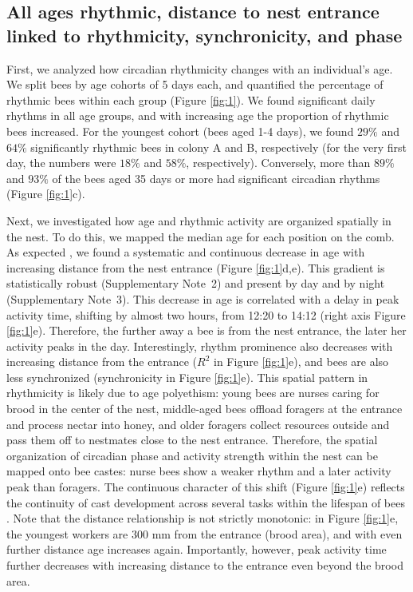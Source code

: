 \documentclass{article}
\newcommand{\added}[1]{{\color{blue}#1}}
\newcommand{\added}[1]{#1}
\begin{document}
\subsection{All ages rhythmic, distance to nest entrance linked to rhythmicity, synchronicity, and phase}
First, we analyzed how circadian rhythmicity changes with an individual’s age. We split bees by age cohorts of 5 days each, and quantified the percentage of rhythmic bees within each group (Figure \ref{fig:1}). We found significant daily rhythms in all age groups, and with increasing age the proportion of rhythmic bees increased. For the youngest cohort (bees aged 1-4 days), we found $29\%$ and $64\%$ significantly rhythmic bees in colony A and B, respectively (for the very first day, the numbers were $18\%$ and $58\%$, respectively). Conversely, more than $89\%$ and $93\%$ of the bees aged 35 days or more had significant circadian rhythms (Figure \ref{fig:1}c).

Next, we investigated how age and rhythmic activity are organized spatially in the nest. To do this, we mapped the median age for each position on the comb. As expected \cite{von_frisch_tanze_1965, seeley_wisdom_1995}, we found a systematic and continuous decrease in age with increasing distance from the nest entrance (Figure \ref{fig:1}d,e). \added{This gradient is statistically robust (Supplementary Note~2) and present by day and by night (Supplementary Note~3).} This decrease in age is correlated with a delay in peak activity time, shifting by almost two hours, from 12:20 to 14:12 (right axis Figure \ref{fig:1}e). Therefore, the further away a bee is from the nest entrance, the later her activity peaks in the day. Interestingly, rhythm prominence also decreases with increasing distance from the entrance ($R^2$ in Figure \ref{fig:1}e), and bees are also less synchronized (synchronicity in Figure \ref{fig:1}e). This spatial pattern in rhythmicity is likely due to age polyethism: young bees are nurses caring for brood in the center of the nest, middle-aged bees offload foragers at the entrance and process nectar into honey, and \added{older} foragers collect resources outside and pass them off to nestmates close to the nest entrance. Therefore, the spatial organization of circadian phase and activity strength within the nest can be mapped onto bee castes: nurse bees show a weaker rhythm and a later activity peak than foragers. The continuous character of this shift (Figure \ref{fig:1}e) reflects the continuity of cast development across several tasks within the lifespan of bees \cite{wild_social_2021}. 
Note that the distance relationship is not strictly monotonic: in Figure \ref{fig:1}e, the youngest workers are 300 mm from the entrance (brood area), and with even further distance age increases again. Importantly, however, peak activity time further decreases with increasing distance to the entrance even beyond the brood area.  
\end{document}
